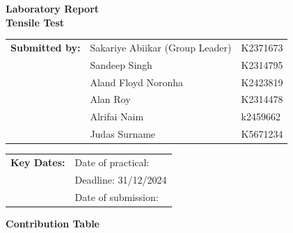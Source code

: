 \documentclass{article}
\begin{document}
        

    \vspace*{\fill}
    \begin{center}
        \textbf{\Huge Laboratory Report}\\[10pt]
        \LARGE \textbf{Tensile Test}
    \end{center}
    \vspace*{\fill}

    \Large    
    \begin{tabular}{@{}l l l@{}}
        \textbf{Submitted by:} & Sakariye Abiikar (Group Leader)\phantom{ssssss} & K2371673 \\
        & Sandeep Singh & K2314795 \\
        & Aland Floyd Noronha & K2423819 \\
        & Alan Roy & K2314478 \\
        & Alrifai Naim & k2459662 \\
        & Judas Surname & K5671234 \\
    \end{tabular}
    
    \vspace*{\fill}
    
    \begin{tabular}{@{}l l@{}}
        \textbf{Key Dates:} & Date of practical: \\
        & Deadline: 31/12/2024 \\
        & Date of submission: \\
    \end{tabular}
    \vspace*{\fill}
    
    \large
    \newpage\noindent\vspace{2em}
    \begin{center}
        \LARGE \textbf{Contribution Table}\\[3em]
    \end{center}
    
\end{document}
